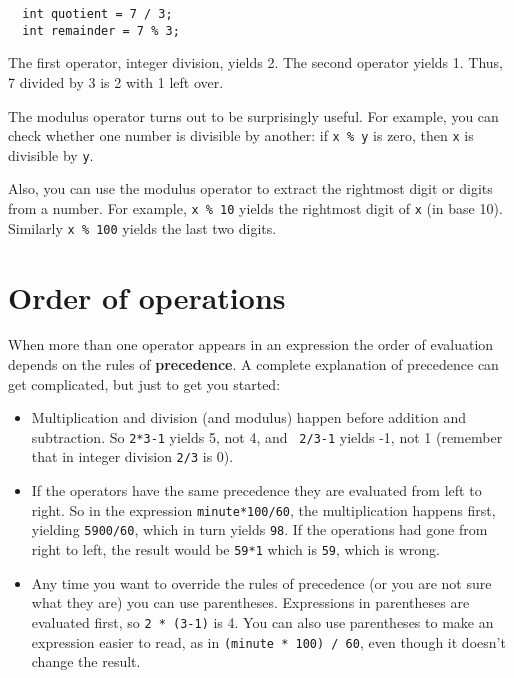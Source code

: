 \begin{verbatim}
  int quotient = 7 / 3;
  int remainder = 7 % 3;
\end{verbatim}
%
The first operator, integer division, yields 2.  The second
operator yields 1.  Thus, 7 divided by 3 is 2 with 1 left over.

The modulus operator turns out to be surprisingly useful.  For
example, you can check whether one number is divisible by
another: if {\tt x \% y} is zero, then {\tt x} is divisible
by {\tt y}.

Also, you can use the modulus operator to extract the rightmost
digit or digits from a number.  For example, {\tt x \% 10} yields
the rightmost digit of {\tt x} (in base 10).  Similarly
{\tt x \% 100} yields the last two digits.

\section{Order of operations}

When more than one operator appears in an expression the order
of evaluation depends on the rules of {\bf precedence}.  A
complete explanation of precedence can get complicated, but
just to get you started:

\begin{itemize}

\item Multiplication and division (and modulus) happen before
addition and subtraction.  So {\tt 2*3-1} yields 5, not 4, and {\tt
2/3-1} yields -1, not 1 (remember that in integer division {\tt 2/3}
is 0).

\item If the operators have the same precedence they are evaluated
from left to right.  So in the expression {\tt minute*100/60},
the multiplication happens first, yielding {\tt 5900/60}, which
in turn yields {\tt 98}.  If the operations had gone from right
to left, the result would be {\tt 59*1} which is {\tt 59}, which
is wrong.

\item Any time you want to override the rules of precedence (or
you are not sure what they are) you can use parentheses.  Expressions
in parentheses are evaluated first, so {\tt 2 * (3-1)} is 4.
You can also use parentheses to make an expression easier to
read, as in {\tt (minute * 100) / 60}, even though it doesn't
change the result.

\end{itemize}

